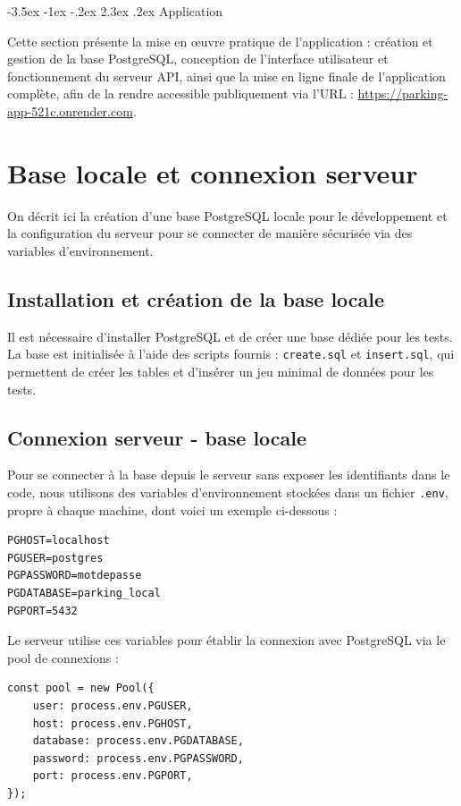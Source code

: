 \documentclass[a4paper,12pt]{report}
\makeatletter
\def\chapter{\@startsection {chapter}{0}{\z@}
                                   {-3.5ex \@plus -1ex \@minus -.2ex}
                                   {2.3ex \@plus.2ex}
                                   {\normalfont\huge\bfseries}}
\makeatother
\begin{document}
\chapter{Application}
\label{sec:application}

Cette section présente la mise en œuvre pratique de l’application : création et gestion de la base PostgreSQL, conception de l’interface utilisateur et fonctionnement du serveur API, ainsi que la mise en ligne finale de l’application complète, afin de la rendre accessible publiquement via l’URL : \url{https://parking-app-521c.onrender.com}.

\section{Base locale et connexion serveur}
\label{subsec:base-locale}

On décrit ici la création d’une base PostgreSQL locale pour le développement et la configuration du serveur pour se connecter de manière sécurisée via des variables d’environnement.


\subsection{Installation et création de la base locale}
Il est nécessaire d’installer PostgreSQL et de créer une base dédiée pour les tests.  
La base est initialisée à l’aide des scripts fournis : \texttt{create.sql} et \texttt{insert.sql},  
qui permettent de créer les tables et d’insérer un jeu minimal de données pour les tests.

\subsection{Connexion serveur - base locale}
Pour se connecter à la base depuis le serveur sans exposer les identifiants dans le code, nous utilisons des variables d’environnement stockées dans un fichier \texttt{.env}, propre à chaque machine, dont voici un  exemple ci-dessous :

\begin{verbatim}
PGHOST=localhost
PGUSER=postgres
PGPASSWORD=motdepasse
PGDATABASE=parking_local
PGPORT=5432
\end{verbatim}

Le serveur utilise ces variables pour établir la connexion avec PostgreSQL via le pool de connexions :


\begin{verbatim}
const pool = new Pool({
    user: process.env.PGUSER,
    host: process.env.PGHOST,
    database: process.env.PGDATABASE,
    password: process.env.PGPASSWORD,
    port: process.env.PGPORT,
});
\end{verbatim}
\end{document}
